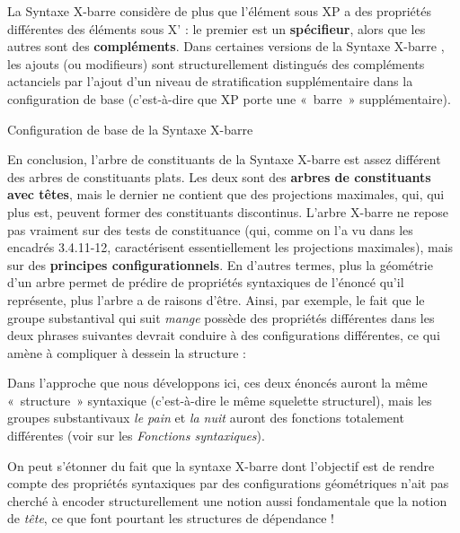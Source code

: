 {    La Syntaxe X-barre considère de plus que l’élément sous XP a des propriétés différentes des éléments sous X’ : le premier est un \textbf{spécifieur}, alors que les autres sont des \textbf{compléments}. Dans certaines versions de la Syntaxe X-barre \citep{Jackendoff1977}, les ajouts (ou modifieurs) sont structurellement distingués des compléments actanciels par l’ajout d’un niveau de stratification supplémentaire dans la configuration de base (c’est-à-dire que XP porte une «~barre~» supplémentaire).

\ea{
    }

    Configuration de base de la Syntaxe X-barre
    \z

    En conclusion, l’arbre de constituants de la Syntaxe X-barre est assez différent des arbres de constituants plats. Les deux sont des \textbf{arbres de constituants avec têtes}, mais le dernier ne contient que des projections maximales, qui, qui plus est, peuvent former des constituants discontinus. L’arbre X-barre ne repose pas vraiment sur des tests de constituance (qui, comme on l’a vu dans les encadrés 3.4.11-12, caractérisent essentiellement les projections maximales), mais sur des \textbf{principes configurationnels}. En d’autres termes, plus la géométrie d’un arbre permet de prédire de propriétés syntaxiques de l’énoncé qu’il représente, plus l’arbre a de raisons d’être. Ainsi, par exemple, le fait que le groupe substantival qui suit \textit{mange} possède des propriétés différentes dans les deux phrases suivantes devrait conduire à des configurations différentes, ce qui amène à compliquer à dessein la structure :

    \z

    \z

    Dans l’approche que nous développons ici, ces deux énoncés auront la même «~structure~» syntaxique (c’est-à-dire le même squelette structurel), mais les groupes substantivaux \textit{le pain} et \textit{la nuit} auront des fonctions totalement différentes (voir  sur les \textit{Fonctions syntaxiques}).

    On peut s’étonner du fait que la syntaxe X-barre dont l’objectif est de rendre compte des propriétés syntaxiques par des configurations géométriques n’ait pas cherché à encoder structurellement une notion aussi fondamentale que la notion de \textit{tête}, ce que font pourtant les structures de dépendance !
}
